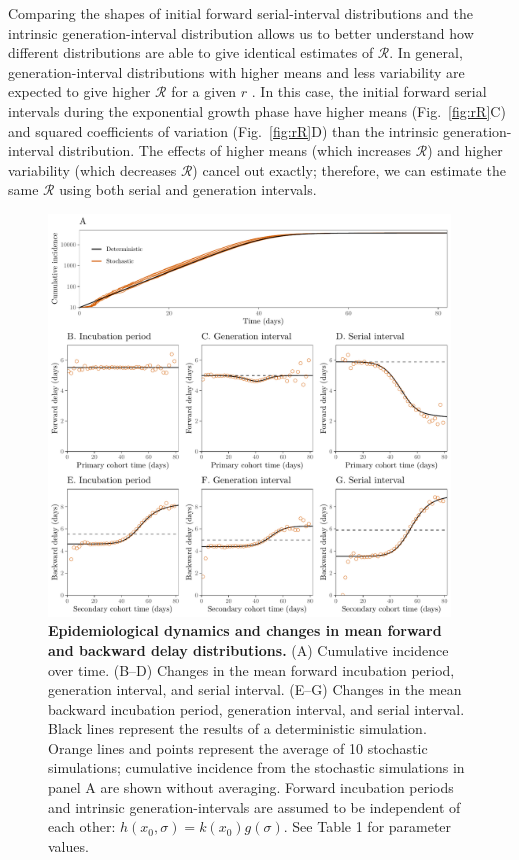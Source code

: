 \documentclass[12pt]{article}
\newcommand{\fref}[1]{Fig.~\ref{fig:#1}}
\newcommand{\RR}{\ensuremath{{\mathcal R}}\xspace}
\begin{document}
Comparing the shapes of initial forward serial-interval distributions and the intrinsic generation-interval distribution allows us to better understand how different distributions are able to give identical estimates of \RR.
In general, generation-interval distributions with higher means and less variability are expected to give higher \RR for a given $r$ \citep{wallinga2007generation, park2019practical}.
In this case, the initial forward serial intervals during the exponential growth phase have higher means (\fref{rR}C) and squared coefficients of variation (\fref{rR}D) than the intrinsic generation-interval distribution.
The effects of higher means (which increases \RR) and higher variability (which decreases \RR) cancel out exactly;
therefore, we can estimate the same \RR using both serial and generation intervals.

\begin{figure}[!ht]
\begin{center}
\includegraphics[width=0.95\textwidth]{forward.pdf}
\caption{
\textbf{Epidemiological dynamics and changes in mean forward and backward delay distributions.}
(A) Cumulative incidence over time.
(B--D) Changes in the mean forward incubation period, generation interval, and serial interval.
(E--G) Changes in the mean backward incubation period, generation interval, and serial interval.
Black lines represent the results of a deterministic simulation.
Orange lines and points represent the average of 10 stochastic simulations;
cumulative incidence from the stochastic simulations in panel A are shown without averaging.
Forward incubation periods and intrinsic generation-intervals are assumed to be independent of each other: $h(x_0, \sigma) = k(x_0) g(\sigma)$.
See Table 1 for parameter values.
}
\end{center}
\label{fig:epi}
\end{figure}
\end{document}

